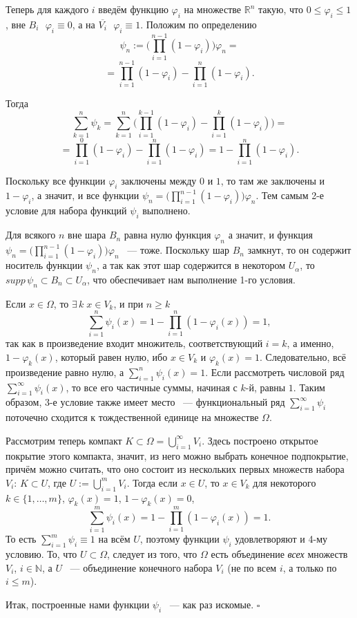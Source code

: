 \documentclass[12pt]{article}
\newcommand{\supp}{supp\,}
\begin{document}
Теперь для каждого $i$ введём функцию $\varphi_i$ на множестве $\mathbb{R}^n$ такую, что $0\le\varphi_i\le1$, вне
$B_i\,$ $\,\varphi_i\equiv0$, а на $\overline{V_i}\,$ $\,\varphi_i\equiv1$. Положим по определению
$$\psi_n:=\bigl(\prod\limits_{i=1}^{n-1} (1-\varphi_i)\bigr)\varphi_n=$$
$$=\prod\limits_{i=1}^{n-1} (1-\varphi_i)-\prod\limits_{i=1}^n (1-\varphi_i).$$

Тогда
$$
  \sum\limits_{k=1}^n \psi_k=
  \sum\limits_{k=1}^n \bigl(\prod\limits_{i=1}^{k-1} (1-\varphi_i)-\prod\limits_{i=1}^k (1-\varphi_i)\bigr)=
$$
$$
  =\prod\limits_{i=1}^0 (1-\varphi_i)-\prod\limits_{i=1}^n (1-\varphi_i)=1-\prod\limits_{i=1}^n (1-\varphi_i).
$$

Поскольку все функции $\varphi_i$ заключены между $0$ и $1$, то там же заключены и $1-\varphi_i$, а значит, и все
функции $\psi_n=\bigl(\prod\limits_{i=1}^{n-1} (1-\varphi_i)\bigr)\varphi_n$. Тем самым 2-е условие для набора
функций $\psi_i$ выполнено.

Для всякого $n$ вне шара $B_n$ равна нулю функция $\varphi_n$ а значит, и функция
$\psi_n=\bigl(\prod\limits_{i=1}^{n-1} (1-\varphi_i)\bigr)\varphi_n$ ~--- тоже. Поскольку шар $B_n$ замкнут, то он
содержит носитель функции $\psi_n$, а так как этот шар содержится в некотором $U_{\alpha}$, то $\supp\psi_n\subset
B_n\subset U_{\alpha}$, что обеспечивает нам выполнение 1-го условия.

Если $x\in\Omega$, то $\exists\,k\;x\in V_k$, и при $n\ge k$
$$
  \sum\limits_{i=1}^n \psi_i(x)=1-\prod\limits_{i=1}^n (1-\varphi_i(x))=1,
$$
так как в произведение входит множитель, соответствующий $i=k$, а именно, $1-\varphi_k(x)$, который равен нулю,
ибо $x\in V_k$ и $\varphi_k(x)=1$. Следовательно, всё произведение равно нулю, а $\sum\limits_{i=1}^n
\psi_i(x)=1$. Если рассмотреть числовой ряд $\sum\limits_{i=1}^{\infty} \psi_i(x)$, то все его частичные суммы,
начиная с $k$-й, равны $1$. Таким образом, 3-е условие также имеет место ~--- функциональный ряд
$\sum\limits_{i=1}^{\infty} \psi_i$ поточечно сходится к тождественной единице на множестве $\Omega$.

Рассмотрим теперь компакт $K\subset\Omega=\bigcup\limits_{i=1}^{\infty} V_i$. Здесь построено открытое покрытие
этого компакта, значит, из него можно выбрать конечное подпокрытие, причём можно считать, что оно состоит из
нескольких первых множеств набора $V_i$: $K\subset U$, где $U:=\bigcup\limits_{i=1}^m V_i$. Тогда если $x\in U$,
то $x\in V_k$ для некоторого $k\in\{1,\dots,m\}$, $\varphi_k(x)=1$, $1-\varphi_k(x)=0$, $$\sum\limits_{i=1}^m
\psi_i(x)=1-\prod\limits_{i=1}^m (1-\varphi_i(x))=1.$$ То есть $\sum\limits_{i=1}^m \psi_i\equiv1$ на всём $U$,
поэтому функции $\psi_i$ удовлетворяют и 4-му условию. То, что $U\subset\Omega$, следует из того, что $\Omega$
есть объединение
\textit{всех} множеств $V_i$, $i\in\mathbb{N}$, а $U$ ~--- объединение конечного набора $V_i$ (не
по всем $i$, а только по $i\le m$).

Итак, построенные нами функции $\psi_i$ ~--- как раз искомые. $\square$
\end{document}
